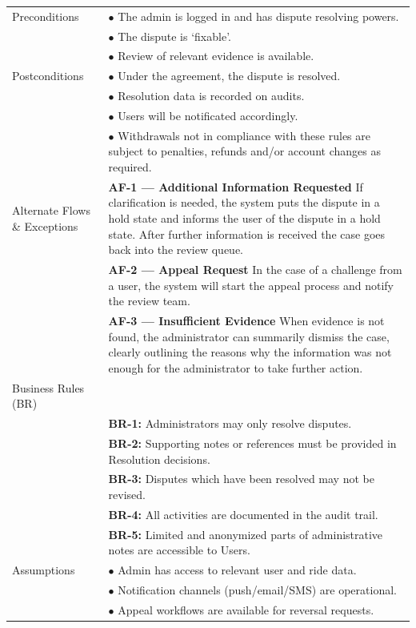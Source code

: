 \begin{longtable}{|>{\raggedright\arraybackslash}p{4cm}|>{\raggedright\arraybackslash}p{11cm}|}
\hline
Preconditions & $\bullet$ The admin is logged in and has dispute resolving powers. \\
& $\bullet$ The dispute is ‘fixable'. \\
& $\bullet$ Review of relevant evidence is available. \\
\hline
Postconditions & $\bullet$ Under the agreement, the dispute is resolved. \\
& $\bullet$ Resolution data is recorded on audits. \\
& $\bullet$ Users will be notificated accordingly. \\
& $\bullet$ Withdrawals not in compliance with these rules are subject to penalties, refunds and/or account changes as required. \\
\hline
Alternate Flows \& Exceptions & \textbf{AF-1 — Additional Information Requested} \newline If clarification is needed, the system puts the dispute in a hold state and informs the user of the dispute in a hold state. After further information is received the case goes back into the review queue. \\
& \textbf{AF-2 — Appeal Request} \newline In the case of a challenge from a user, the system will start the appeal process and notify the review team. \\
& \textbf{AF-3 — Insufficient Evidence} \newline When evidence is not found, the administrator can summarily dismiss the case, clearly outlining the reasons why the information was not enough for the administrator to take further action. \\
\hline
Business Rules (BR) & \\
& \textbf{BR-1:} Administrators may only resolve disputes. \\
& \textbf{BR-2:} Supporting notes or references must be provided in Resolution decisions. \\
& \textbf{BR-3:} Disputes which have been resolved may not be revised. \\
& \textbf{BR-4:} All activities are documented in the audit trail. \\
& \textbf{BR-5:} Limited and anonymized parts of administrative notes are accessible to Users. \\
\hline
Assumptions & $\bullet$ Admin has access to relevant user and ride data. \\
& $\bullet$ Notification channels (push/email/SMS) are operational. \\
& $\bullet$ Appeal workflows are available for reversal requests. \\
\hline
\end{longtable}
